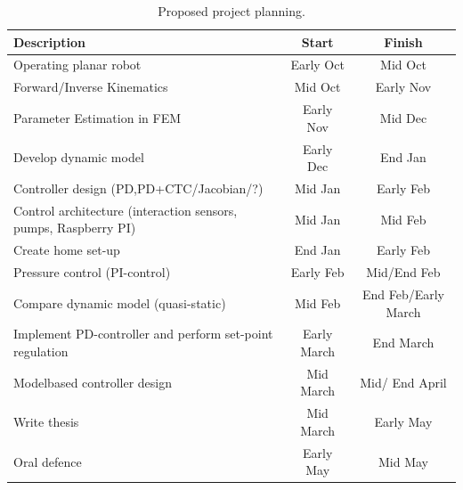 \begin{table}[H]
    \centering
    \begin{tabular}{|p{8.1cm}|c|c|} \hline
      \textbf{Description}                        & \textbf{Start}    & \textbf{Finish}    \\ \hline
      Operating planar robot                      & Early Oct         & Mid Oct\\  \hline
      Forward/Inverse Kinematics             & Mid Oct           & Early Nov\\  \hline
      Parameter Estimation in FEM                 & Early Nov         & Mid Dec \\  \hline
      Develop dynamic model                       & Early Dec         & End Jan  \\  \hline
      Controller design (PD,PD+CTC/Jacobian/?)                & Mid Jan           & Early Feb \\  \hline
      Control architecture (interaction  sensors, pumps, Raspberry PI) & Mid Jan  & Mid Feb \\  \hline
      Create home set-up & End Jan  & Early Feb \\  \hline      
      Pressure control (PI-control)            & Early Feb         & Mid/End Feb \\  \hline
      Compare dynamic model (quasi-static)  & Mid Feb           & End Feb/Early March \\  \hline
      Implement PD-controller and perform set-point regulation & Early March & End March \\  \hline
      Modelbased controller design                & Mid March   &  Mid/ End April \\  \hline
      Write thesis                                & Mid March         & Early May \\  \hline
      Oral defence                                & Early May         & Mid May \\ \hline
    \end{tabular}
    \caption{Proposed project planning.}
    \label{tab1:projectplanning}
\end{table}

